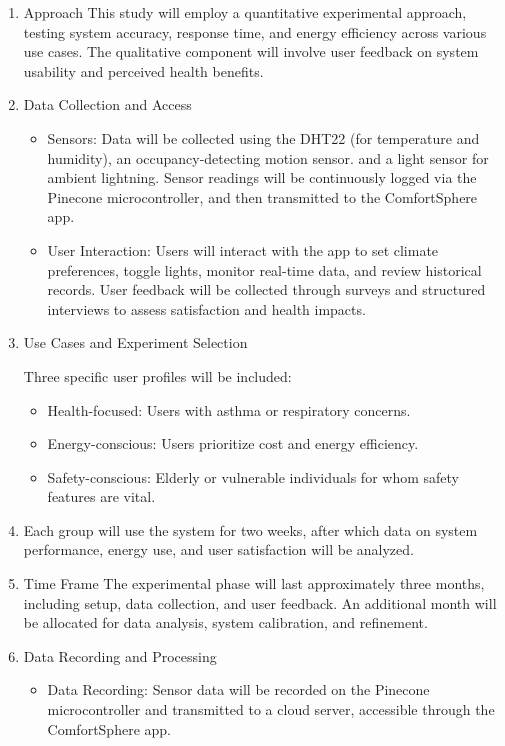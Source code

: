 \documentclass{article}
\begin{document}
\begin{enumerate}
    \item Approach
This study will employ a quantitative experimental approach, testing system accuracy, response time, and energy efficiency across various use cases. The qualitative component will involve user feedback on system usability and perceived health benefits.
    \item Data Collection and Access
\begin{itemize}
    \item Sensors: Data will be collected using the DHT22 (for temperature and humidity), an occupancy-detecting motion sensor. and a light sensor for ambient lightning. Sensor readings will be continuously logged via the Pinecone microcontroller, and then transmitted to the ComfortSphere app.
\end{itemize}
\begin{itemize}
    \item User Interaction: Users will interact with the app to set climate preferences, toggle lights, monitor real-time data, and review historical records. User feedback will be collected through surveys and structured interviews to assess satisfaction and health impacts.
\end{itemize}

    \item Use Cases and Experiment Selection

    Three specific user profiles will be included:
\begin{itemize}
    \item Health-focused: Users with asthma or respiratory concerns.

    \item Energy-conscious: Users prioritize cost and energy efficiency.
    \item Safety-conscious: Elderly or vulnerable individuals for whom safety features are vital.
\end{itemize}

    \item Each group will use the system for two weeks, after which data on system performance, energy use, and user 
satisfaction will be analyzed.
    \item Time Frame
The experimental phase will last approximately three months, including setup, data collection, and user feedback. An additional month will be allocated for data analysis, system calibration, and refinement.
    \item Data Recording and Processing
\begin{itemize}
    \item Data Recording: Sensor data will be recorded on the Pinecone microcontroller and transmitted to a cloud server, accessible through the ComfortSphere app.


\end{itemize}
\end{enumerate}
\end{document}
